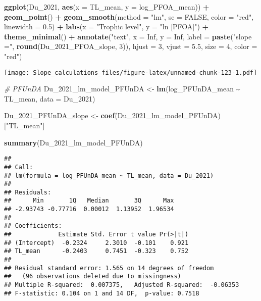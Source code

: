 \documentclass[
]{article}
\newenvironment{Shaded}{\begin{snugshade}}{\end{snugshade}}
\newcommand{\AttributeTok}[1]{\textcolor[rgb]{0.13,0.29,0.53}{#1}}
\newcommand{\CommentTok}[1]{\textcolor[rgb]{0.56,0.35,0.01}{\textit{#1}}}
\newcommand{\ConstantTok}[1]{\textcolor[rgb]{0.56,0.35,0.01}{#1}}
\newcommand{\DecValTok}[1]{\textcolor[rgb]{0.00,0.00,0.81}{#1}}
\newcommand{\FloatTok}[1]{\textcolor[rgb]{0.00,0.00,0.81}{#1}}
\newcommand{\FunctionTok}[1]{\textcolor[rgb]{0.13,0.29,0.53}{\textbf{#1}}}
\newcommand{\NormalTok}[1]{#1}
\newcommand{\OtherTok}[1]{\textcolor[rgb]{0.56,0.35,0.01}{#1}}
\newcommand{\SpecialCharTok}[1]{\textcolor[rgb]{0.81,0.36,0.00}{\textbf{#1}}}
\newcommand{\StringTok}[1]{\textcolor[rgb]{0.31,0.60,0.02}{#1}}
\begin{document}
\begin{Shaded}
\begin{Highlighting}[]
\FunctionTok{ggplot}\NormalTok{(Du\_2021, }\FunctionTok{aes}\NormalTok{(}\AttributeTok{x =}\NormalTok{ TL\_mean, }\AttributeTok{y =}\NormalTok{ log\_PFOA\_mean)) }\SpecialCharTok{+}
  \FunctionTok{geom\_point}\NormalTok{() }\SpecialCharTok{+}
  \FunctionTok{geom\_smooth}\NormalTok{(}\AttributeTok{method =} \StringTok{"lm"}\NormalTok{, }\AttributeTok{se =} \ConstantTok{FALSE}\NormalTok{, }\AttributeTok{color =} \StringTok{"red"}\NormalTok{, }\AttributeTok{linewidth =} \FloatTok{0.5}\NormalTok{) }\SpecialCharTok{+}
  \FunctionTok{labs}\NormalTok{(}\AttributeTok{x =} \StringTok{"Trophic level"}\NormalTok{,}
       \AttributeTok{y =} \StringTok{"ln [PFOA]"}\NormalTok{) }\SpecialCharTok{+}
  \FunctionTok{theme\_minimal}\NormalTok{() }\SpecialCharTok{+}
  \FunctionTok{annotate}\NormalTok{(}\StringTok{"text"}\NormalTok{, }\AttributeTok{x =} \ConstantTok{Inf}\NormalTok{, }\AttributeTok{y =} \ConstantTok{Inf}\NormalTok{, }\AttributeTok{label =} \FunctionTok{paste}\NormalTok{(}\StringTok{"slope ="}\NormalTok{, }\FunctionTok{round}\NormalTok{(Du\_2021\_PFOA\_slope, }\DecValTok{3}\NormalTok{)), }
           \AttributeTok{hjust =} \DecValTok{3}\NormalTok{, }\AttributeTok{vjust =} \FloatTok{5.5}\NormalTok{, }\AttributeTok{size =} \DecValTok{4}\NormalTok{, }\AttributeTok{color =} \StringTok{"red"}\NormalTok{)}
\end{Highlighting}
\end{Shaded}

\texttt{[image: Slope\_calculations\_files/figure-latex/unnamed-chunk-123-1.pdf]}

\begin{Shaded}
\begin{Highlighting}[]
\CommentTok{\# PFUnDA}
\NormalTok{Du\_2021\_lm\_model\_PFUnDA }\OtherTok{\textless{}{-}} \FunctionTok{lm}\NormalTok{(log\_PFUnDA\_mean }\SpecialCharTok{\textasciitilde{}}\NormalTok{ TL\_mean,}
                             \AttributeTok{data =}\NormalTok{ Du\_2021)}

\NormalTok{Du\_2021\_PFUnDA\_slope }\OtherTok{\textless{}{-}} \FunctionTok{coef}\NormalTok{(Du\_2021\_lm\_model\_PFUnDA)[}\StringTok{"TL\_mean"}\NormalTok{]}

\FunctionTok{summary}\NormalTok{(Du\_2021\_lm\_model\_PFUnDA)}
\end{Highlighting}
\end{Shaded}

\begin{verbatim}
## 
## Call:
## lm(formula = log_PFUnDA_mean ~ TL_mean, data = Du_2021)
## 
## Residuals:
##      Min       1Q   Median       3Q      Max 
## -2.93743 -0.77716  0.00012  1.13952  1.96534 
## 
## Coefficients:
##             Estimate Std. Error t value Pr(>|t|)
## (Intercept)  -0.2324     2.3010  -0.101    0.921
## TL_mean      -0.2403     0.7451  -0.323    0.752
## 
## Residual standard error: 1.565 on 14 degrees of freedom
##   (96 observations deleted due to missingness)
## Multiple R-squared:  0.007375,   Adjusted R-squared:  -0.06353 
## F-statistic: 0.104 on 1 and 14 DF,  p-value: 0.7518
\end{verbatim}
\end{document}
